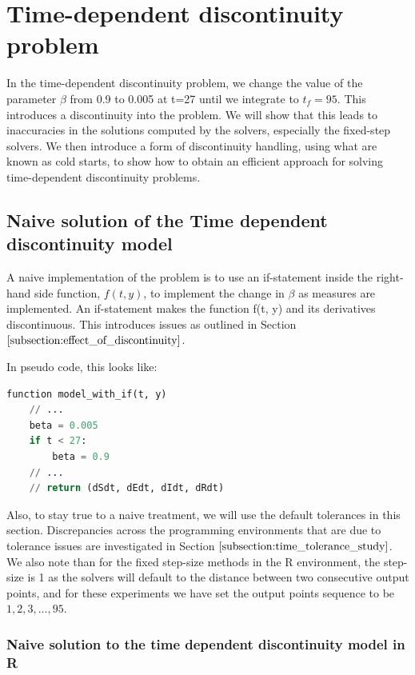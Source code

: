 \section{Time-dependent discontinuity problem}
\label{section:time_problem}
In the time-dependent discontinuity problem, we change the value of the parameter $\beta$ from 0.9 to 0.005 at t=27 until we integrate to $t_f=95$. This introduces a discontinuity into the problem. We will show that this leads to inaccuracies in the solutions computed by the solvers, especially the fixed-step solvers. We then introduce a form of discontinuity handling, using what are known as cold starts, to show how to obtain an efficient approach for solving time-dependent discontinuity problems.

\subsection{Naive solution of the Time dependent discontinuity model}
\label{subsection:naive_time_problem}
A naive implementation of the problem is to use an if-statement inside the right-hand side function, $f(t, y)$, to implement the change in $\beta$ as measures are implemented. An if-statement makes the function f(t, y) and its derivatives discontinuous. This introduces issues as outlined in Section $\ref{subsection:effect_of_discontinuity}$.

In pseudo code, this looks like:

\begin{minipage}{\linewidth}
\begin{lstlisting}[language=Python]
function model_with_if(t, y)
    // ...
    beta = 0.005
    if t < 27:
        beta = 0.9
    // ...
    // return (dSdt, dEdt, dIdt, dRdt)
\end{lstlisting}
\end{minipage}

Also, to stay true to a naive treatment, we will use the default tolerances in this section. Discrepancies across the programming environments that are due to tolerance issues are investigated in Section $\ref{subsection:time_tolerance_study}$. We also note than for the fixed step-size methods in the R environment, the step-size is 1 as the solvers will default to the distance between two consecutive output points, and for these experiments we have set the output points sequence to be $1, 2, 3, ..., 95$.

\subsubsection{Naive solution to the time dependent discontinuity model in R}

